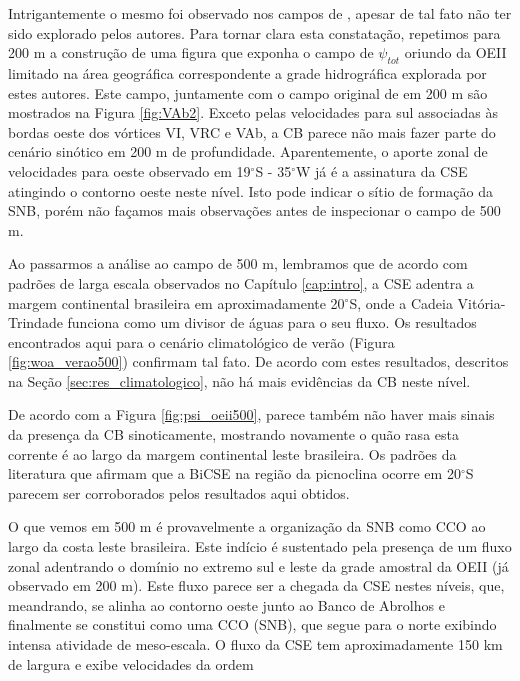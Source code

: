 Intrigantemente o mesmo foi observado nos campos de \cite{silveira_etal2006B}, apesar de tal 
fato não ter sido explorado pelos autores. Para tornar clara esta constatação, repetimos
para 200 m a construção de uma figura que exponha o campo de $\psi_{tot}$ oriundo da OEII limitado 
na área geográfica correspondente a grade hidrográfica explorada por estes autores. Este campo, 
juntamente com o campo original de  \cite{silveira_etal2006B} em 200 m são mostrados na Figura
\ref{fig:VAb2}. Exceto pelas velocidades para sul associadas às bordas oeste dos vórtices VI, VRC e VAb, a CB parece
não mais fazer parte do cenário sinótico em 200 m de profundidade. Aparentemente, o aporte zonal 
de velocidades para oeste observado em 19$^\circ$S - 35$^\circ$W já é a assinatura da CSE atingindo 
o contorno oeste neste nível. Isto pode indicar o sítio de formação da SNB, porém não façamos 
mais observações antes de inspecionar o campo de 500 m. 

Ao passarmos a análise ao campo de 500 m, lembramos que 
de acordo com padrões de larga escala observados no Capítulo \ref{cap:intro}, 
a CSE adentra a margem continental brasileira em aproximadamente 20$^\circ$S, onde a Cadeia Vitória-Trindade
 funciona como um divisor de águas para o seu fluxo. Os resultados encontrados aqui para o 
cenário climatológico de verão (Figura \ref{fig:woa_verao500}) confirmam tal fato.
De acordo com estes resultados, descritos na Seção
\ref{sec:res_climatologico}, não há mais evidências da CB neste nível.

De acordo com a Figura \ref{fig:psi_oeii500}, parece também não haver mais sinais da presença da CB sinoticamente, 
mostrando novamente o quão rasa esta corrente é ao largo da margem continental leste brasileira. Os padrões da 
literatura que afirmam que a BiCSE na região da picnoclina ocorre em 20$^\circ$S 
\citep{stramma_england1999,rodrigues_etal2006} parecem ser corroborados pelos resultados 
aqui obtidos.  

O que vemos em 500 m é provavelmente a organização da SNB como CCO ao largo da costa leste brasileira. Este
indício é sustentado pela presença de um fluxo zonal adentrando o domínio no extremo sul e leste
da grade amostral da OEII (já observado em 200 m). Este fluxo parece ser a chegada da CSE nestes níveis, que, meandrando, 
se alinha ao contorno oeste junto ao Banco de Abrolhos e finalmente se constitui como uma CCO
(SNB), que segue para o norte exibindo intensa atividade de meso-escala. O fluxo da CSE tem aproximadamente
150 km de largura e exibe velocidades da ordem

